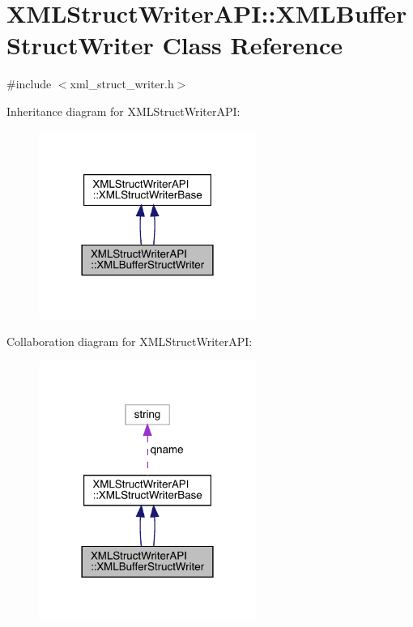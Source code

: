 \hypertarget{classXMLStructWriterAPI_1_1XMLBufferStructWriter}{}\section{X\+M\+L\+Struct\+Writer\+A\+PI\+:\+:X\+M\+L\+Buffer\+Struct\+Writer Class Reference}
\label{classXMLStructWriterAPI_1_1XMLBufferStructWriter}


{\ttfamily \#include $<$xml\+\_\+struct\+\_\+writer.\+h$>$}



Inheritance diagram for X\+M\+L\+Struct\+Writer\+A\+PI\+:\nopagebreak
\begin{figure}[H]
\begin{center}
\leavevmode
\includegraphics[width=201pt]{dc/dcd/classXMLStructWriterAPI_1_1XMLBufferStructWriter__inherit__graph}
\end{center}
\end{figure}


Collaboration diagram for X\+M\+L\+Struct\+Writer\+A\+PI\+:\nopagebreak
\begin{figure}[H]
\begin{center}
\leavevmode
\includegraphics[width=201pt]{d0/d60/classXMLStructWriterAPI_1_1XMLBufferStructWriter__coll__graph}
\end{center}
\end{figure}
